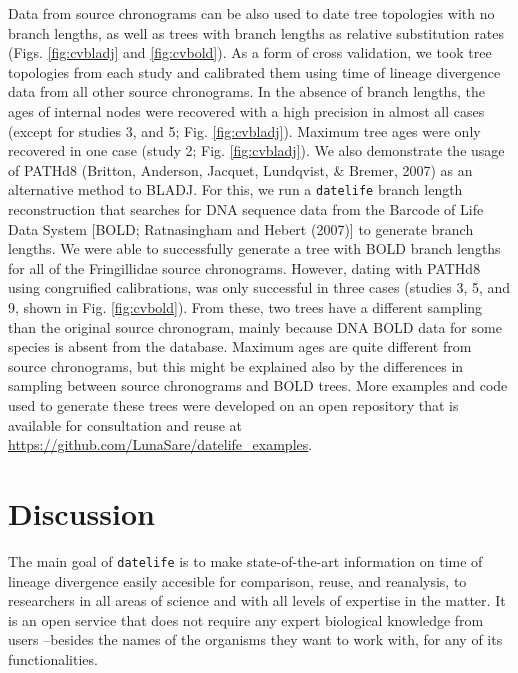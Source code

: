 \documentclass[
  english,
  man]{apa6}
\begin{document}
Data from source chronograms can be also used to date tree topologies with no branch lengths, as well as trees with branch lengths as relative substitution rates (Figs. \ref{fig:cvbladj} and \ref{fig:cvbold}). As a form of cross validation, we took tree topologies from each study and calibrated them using time of lineage divergence data from all other source chronograms. In the absence of branch lengths, the ages of internal nodes were recovered with a high precision in almost all cases (except for studies 3, and 5; Fig. \ref{fig:cvbladj}).
Maximum tree ages were only recovered in one case (study 2; Fig. \ref{fig:cvbladj}).
We also demonstrate the usage of PATHd8 (Britton, Anderson, Jacquet, Lundqvist, \& Bremer, 2007) as an alternative method to BLADJ. For this, we run a \texttt{datelife} branch length reconstruction that searches for DNA sequence data from the Barcode of Life Data System {[}BOLD; Ratnasingham and Hebert (2007){]} to generate branch lengths. We were able to successfully generate a tree with BOLD branch lengths for all of the Fringillidae source chronograms. However, dating with PATHd8 using congruified calibrations, was only successful in
three cases (studies 3, 5, and 9, shown in Fig. \ref{fig:cvbold}). From these, two trees have a different sampling than the original source chronogram, mainly because DNA BOLD data for some species is absent from the database. Maximum ages are quite different from source chronograms, but this might be explained also by the differences in sampling between source chronograms and BOLD trees.
More examples and code used to generate these trees were developed on an open repository that is available for consultation and reuse at \url{https://github.com/LunaSare/datelife_examples}.

\hypertarget{discussion}{%
\section{Discussion}\label{discussion}}

The main goal of \texttt{datelife} is to make state-of-the-art information on time of lineage divergence easily accesible for comparison, reuse, and reanalysis, to researchers in all areas of science and with all levels of expertise in the matter. It is an open service that does not require any expert biological knowledge from users --besides the names of the organisms they want to work with, for any of its functionalities.
\end{document}
